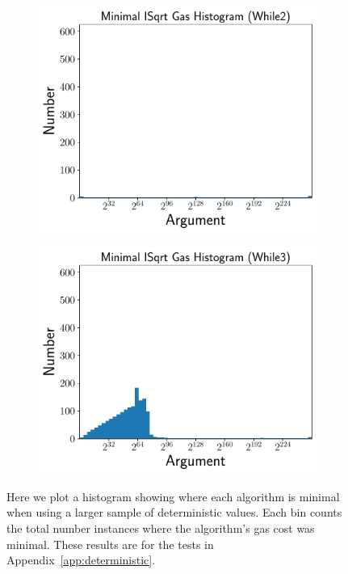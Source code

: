 \begin{figure}[p]
    \begin{subfigure}[t]{0.45\textwidth}
    \includegraphics[width=\textwidth]{plots/minimal_hist_While2_ed.pdf}
    \end{subfigure}
    \begin{subfigure}[t]{0.45\textwidth}
    \includegraphics[width=\textwidth]{plots/minimal_hist_While3_ed.pdf}
    \end{subfigure}
    \caption{Here we plot a histogram showing where each algorithm is minimal
        when using a larger sample of deterministic values.
        Each bin counts the total number instances where the algorithm's
        gas cost was minimal.
        These results are for the tests in Appendix~\ref{app:deterministic}.
        }
    \label{fig:minimal_gas_hist_ed}
\end{figure}
